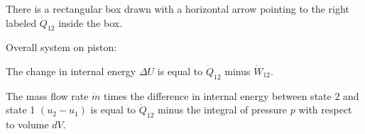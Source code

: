 There is a rectangular box drawn with a horizontal arrow pointing to the right labeled \( \dot{Q}_{12} \) inside the box.

Overall system on piston:

The change in internal energy \( \Delta U \) is equal to \( \dot{Q}_{12} \) minus \( \dot{W}_{12} \).

The mass flow rate \( \dot{m} \) times the difference in internal energy between state 2 and state 1 \( (u_2 - u_1) \) is equal to \( \dot{Q}_{12} \) minus the integral of pressure \( p \) with respect to volume \( dV \).